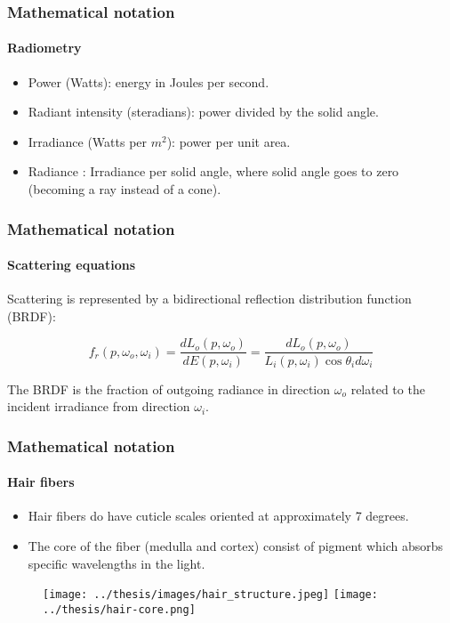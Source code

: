 \documentclass{beamer}
\begin{document}
  
  \begin{frame}
    \frametitle{Mathematical notation}
	\framesubtitle{Radiometry}
	\begin{itemize}
	\item Power (Watts): energy in Joules per second.
	\item Radiant intensity (steradians): power divided by the solid angle.
	\item Irradiance (Watts per $m^2$): power per unit area.
	\item Radiance : Irradiance per solid angle, where solid angle goes to zero (becoming a ray instead of a cone).
	\end{itemize}
  \end{frame}
  
  \begin{frame}
    \frametitle{Mathematical notation}
	\framesubtitle{Scattering equations}
	
	Scattering is represented by a bidirectional reflection distribution function (BRDF):
	
	\begin{equation}
	f_r(p, \omega_o, \omega_i) = \frac{dL_o(p, \omega_o)}{dE(p, \omega_i)} = \frac{dL_o(p, \omega_o)}{L_i(p, \omega_i) \cos \theta_i d\omega_i}
	\end{equation}
	
	The BRDF is the fraction of outgoing radiance in direction $\omega_o$ related to the incident irradiance from direction $\omega_i$.

  \end{frame}
  
  \begin{frame}
    \frametitle{Mathematical notation}
	\framesubtitle{Hair fibers}
	
	\begin{itemize}
	\item Hair fibers do have cuticle scales oriented at approximately 7 degrees.
	\item The core of the fiber (medulla and cortex) consist of pigment which absorbs specific wavelengths in the light.
	\end{itemize}
	
	\begin{figure}
	\texttt{[image: ../thesis/images/hair\_structure.jpeg]}
	\texttt{[image: ../thesis/hair-core.png]}
	\end{figure}
	
  \end{frame}
  
\end{document}
